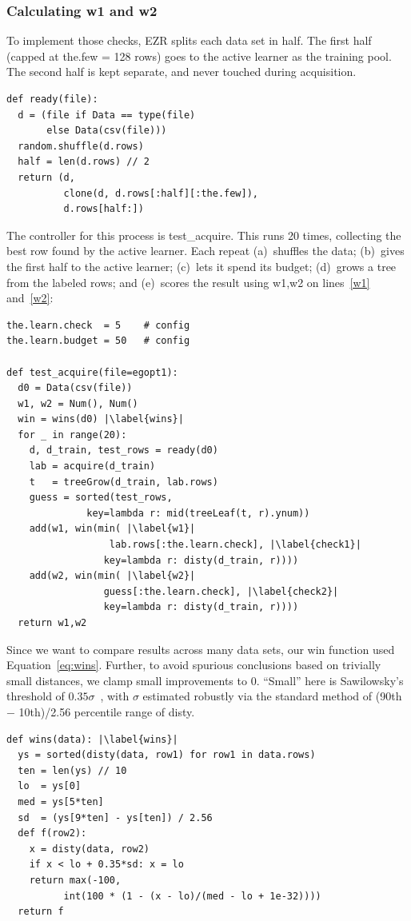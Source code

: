 \documentclass[AMA,STIX2COL]{WileyNJDv5}
\begin{document}
\subsubsection{Calculating \textsf{w1} and \textsf{w2}}
To implement those checks, EZR splits each data set in half.
The first half (capped at \textsf{the.few} = 128 rows) goes to
the active learner as the training pool. The second half is
kept separate, and never touched during acquisition.
\begin{lstlisting}
def ready(file):
  d = (file if Data == type(file)
       else Data(csv(file)))
  random.shuffle(d.rows)
  half = len(d.rows) // 2
  return (d, 
          clone(d, d.rows[:half][:the.few]),
          d.rows[half:])
\end{lstlisting}
The controller for this process is \textsf{test\_acquire}. This runs 
20 times, collecting the best row found by the active learner. Each 
repeat (a)~shuffles the data; (b)~gives the first half to the active 
learner; (c)~lets it spend its budget; (d)~grows a tree from the 
labeled rows; and (e)~scores the result using \textsf{w1,w2}  on lines~\ref{w1} 
and~\ref{w2}:
\begin{lstlisting}
the.learn.check  = 5    # config
the.learn.budget = 50   # config

def test_acquire(file=egopt1):
  d0 = Data(csv(file))
  w1, w2 = Num(), Num()
  win = wins(d0) |\label{wins}|
  for _ in range(20):
    d, d_train, test_rows = ready(d0)
    lab = acquire(d_train)
    t   = treeGrow(d_train, lab.rows)
    guess = sorted(test_rows,
              key=lambda r: mid(treeLeaf(t, r).ynum))
    add(w1, win(min( |\label{w1}|
                  lab.rows[:the.learn.check], |\label{check1}|
                 key=lambda r: disty(d_train, r))))
    add(w2, win(min( |\label{w2}|
                 guess[:the.learn.check], |\label{check2}|
                 key=lambda r: disty(d_train, r))))
  return w1,w2
\end{lstlisting}

Since we want to compare results across
many data sets,
our \textsf{win} function used
Equation~\ref{eq:wins}. Further,
to avoid spurious conclusions based on trivially
small distances, we
clamp small improvements to 0. ``Small'' here is Sawilowsky's
threshold of $0.35\sigma$~\cite{sawilowsky2009new}, with $\sigma$
estimated robustly via  the standard method of   (90th $-$ 10th)/2.56 percentile range
of \textsf{disty}.
\begin{lstlisting}
def wins(data): |\label{wins}| 
  ys = sorted(disty(data, row1) for row1 in data.rows)
  ten = len(ys) // 10
  lo  = ys[0]
  med = ys[5*ten]
  sd  = (ys[9*ten] - ys[ten]) / 2.56
  def f(row2):
    x = disty(data, row2)
    if x < lo + 0.35*sd: x = lo
    return max(-100,
          int(100 * (1 - (x - lo)/(med - lo + 1e-32))))
  return f
\end{lstlisting}
\end{document}
